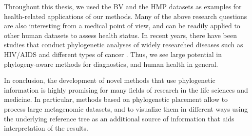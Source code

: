 Throughout this thesis, we used the \acf{BV} \cite{Srinivasan2012} and the \acf{HMP} \citep{Huttenhower2012,Methe2012}
datasets as examples for health-related applications of our methods.
Many of the above research questions are also interesting from a medical point of view,
and can be readily applied to other human datasets to assess health status.
In recent years, there have been studies that conduct phylogenetic analyses of widely researched diseases
such as HIV/AIDS \cite{Castro-Nallar2012,Brenner2013} and different types of cancer \cite{Brown2017a,Abbosh2017}.
Thus, we see large potential in phylogeny-aware methods for diagnostics, and human health in general.

In conclusion, the development of novel methods that use phylogenetic information
is highly promising for many fields of research in the life sciences and medicine.
In particular, methods based on phylogenetic placement allow to process large metagenomic datasets,
and to visualize them in different ways using the underlying reference tree as an additional source
of information that aids interpretation of the results.
